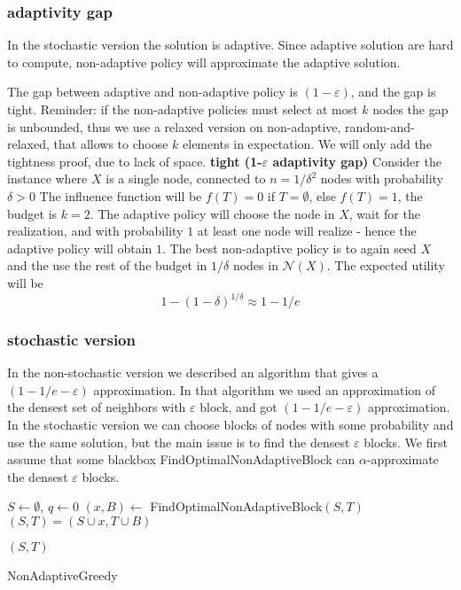 \subsubsection{adaptivity gap}
In the stochastic version the solution is adaptive. Since adaptive solution are hard to compute, non-adaptive policy will approximate the adaptive solution.
 
The gap between adaptive and non-adaptive policy is $(1-\varepsilon)$, and the gap is tight. Reminder: if the non-adaptive policies must select at most $k$ nodes the gap is unbounded, thus we use a relaxed version on non-adaptive, random-and-relaxed, that allows to choose $k$ elements in expectation. We will only add the tightness proof, due to lack of space.
\textbf{tight (1-$\varepsilon$ adaptivity gap)}
Consider the instance where $X$ is a single node, connected to $n=1/\delta^2$ nodes with probability $\delta>0$
The influence function will be $f(T)=0$ if $T=\emptyset$, else $f(T)=1$, the budget is $k=2$.
The adaptive policy will choose the node in $X$, wait for the realization, and with probability $1$ at least one node will realize - hence the adaptive policy will obtain $1$. The best non-adaptive policy is to again seed $X$ and the use the rest of the budget in $1/\delta$ nodes in $\mathcal{N}(X)$. The expected utility will be $$1-(1-\delta)^{1/\delta}\approx 1-1/e$$

\subsubsection{stochastic version}
In the non-stochastic version we described an algorithm that gives a $(1-1/e-\varepsilon)$ approximation. In that algorithm we used an approximation of the densest set of neighbors with $\varepsilon$ block, and got  $(1-1/e-\varepsilon)$ approximation. In the stochastic version we can choose blocks of nodes with some probability and use the same solution, but the main issue is to find the densest $\varepsilon$ blocks.
We first assume that some blackbox FindOptimalNonAdaptiveBlock can $\alpha$-approximate the densest $\varepsilon$ blocks.


\IncMargin{2em}
\begin{algorithm}[h]
	\LinesNumbered
	$S\gets\emptyset$, $q\gets 0$ 
	{
		$(x,B)\gets$ FindOptimalNonAdaptiveBlock$(S,T)$
		$(S,T) = (S\cup x,T\cup B)$
	}

	\Return $(S,T)$
	\caption{NonAdaptiveGreedy}\label{algo:nonAda}
\end{algorithm}\DecMargin{1em}

